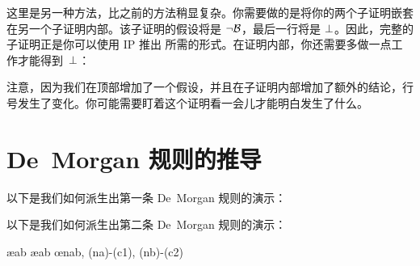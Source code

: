 这里是另一种方法，比之前的方法稍显复杂。你需要做的是将你的两个子证明嵌套在另一个子证明内部。该子证明的假设将是 $\neg \mathcal{B}$，最后一行将是 $\bot$。因此，完整的子证明正是你可以使用 IP 推出  所需的形式。在证明内部，你还需要多做一点工作才能得到~$\bot$：


\begin{fitchproof}
  \open
  \AS
  \open
  \AS
  \ellipsesline
  \close
  \open
  \AS
  \ellipsesline
  \close
  \close
\end{fitchproof}


注意，因为我们在顶部增加了一个假设，并且在子证明内部增加了额外的结论，行号发生了变化。你可能需要盯着这个证明看一会儿才能明白发生了什么。

\section{De~Morgan 规则的推导}
以下是我们如何派生出第一条 De~Morgan 规则的演示：


\begin{fitchproof}
		\open
			\AS
			\open
				\AS
			\close
		\close
		\open
			\AS
		\close
	\end{fitchproof}


以下是我们如何派生出第二条 De~Morgan 规则的演示：


\begin{fitchproof}
		\open
			\AS
			\ae{ab}
			\ae{ab}
			\open
				\AS
			\close
			\open
				\AS
			\close
			\oe{nab, (na)-(c1), (nb)-(c2)}
		\close
	\end{fitchproof}



